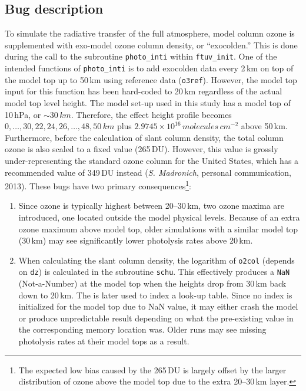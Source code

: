 \subsection{Bug description}\label{a-ssec:bug/ftuv/bug}
	To simulate the radiative transfer of the full atmosphere, model column ozone is supplemented with exo-model ozone column density, or ``exocolden.'' This is done during the call to the subroutine \texttt{photo\_inti} within \texttt{ftuv\_init}. One of the intended functions of \texttt{photo\_inti} is to add exocolden data every 2\,\unit{km} on top of the model top up to 50\,\unit{km} using reference data (\texttt{o3ref}). However, the model top input for this function has been hard-coded to 20\,\unit{km} regardless of the actual model top level height. The model set-up used in this study has a model top of 10\,\unit{hPa}, or $\sim30\,\unit{km}$. Therefore, the effect height profile becomes $0,\ldots,30,22,24,26,\ldots,48,50\,\unit{km}$ plus $2.9745\times10^{16}\,\unit{molecules\,cm^{-2}}$ above 50\,\unit{km}. Furthermore, before the calculation of slant column density, the total column ozone is also scaled to a fixed value (265\,\unit{DU}). However, this value is grossly under-representing the standard ozone column for the United States, which has a recommended value of 349\,\unit{DU} instead (\textit{S. Madronich}, personal communication, 2013). These bugs have two primary consequences\footnote{The expected low bias caused by the 265\,\unit{DU} is largely offset by the larger distribution of ozone above the model top due to the extra 20--30\,\unit{km} layer.}:
	\begin{enumerate}
		\item Since ozone is typically highest between 20--30\,\unit{km}, two ozone maxima are introduced, one located outside the model physical levels. Because of an extra ozone maximum above model top, older simulations with a similar model top (30\,\unit{km}) may see significantly lower photolysis rates above 20\,\unit{km}.
		\item When calculating the slant column density, the logarithm of \texttt{o2col} (depends on \texttt{dz}) is calculated in the subroutine \texttt{schu}. This effectively produces a \texttt{NaN} (Not-a-Number) at the model top when the heights drop from 30\,\unit{km} back down to 20\,\unit{km}. The is later used to index a look-up table. Since no index is initialized for the model top due to NaN value, it may either crash the model or produce unpredictable result depending on what the pre-existing value in the corresponding memory location was. Older runs may see missing photolysis rates at their model tops as a result.
	\end{enumerate}

